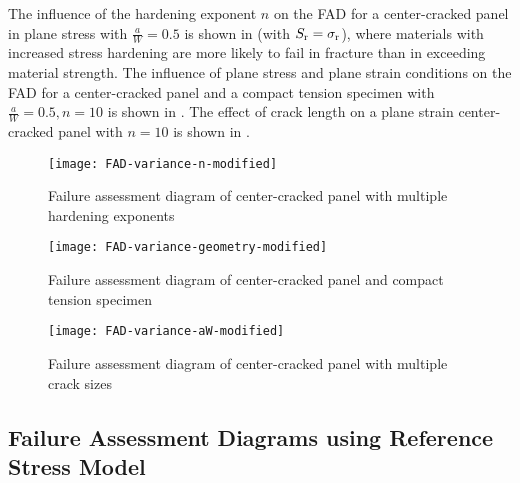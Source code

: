 The influence of the hardening exponent \(n\) on the FAD for a center-cracked panel in plane stress with \(\frac{a}{W} = 0.5\) is shown in  (with \(S_{\text{r}} = \sigma_{\textnormal{r}}\)), where materials with increased stress hardening are more likely to fail in fracture than in exceeding material strength.
The influence of plane stress and plane strain conditions on the FAD for a center-cracked panel and a compact tension specimen with \(\frac{a}{W} = 0.5, n = 10\) is shown in .
The effect of crack length on a plane strain center-cracked panel with \(n = 10\) is shown in .
\begin{figure}
\centering
\texttt{[image: FAD-variance-n-modified]}
\caption[Failure assessment diagram of center-cracked panel with multiple hardening exponents]{\label{fig:fad-ccp-multiple-n} Failure assessment diagram of center-cracked panel with multiple hardening exponents \cite{epri1981}}
\end{figure}
\begin{figure}
\centering
\texttt{[image: FAD-variance-geometry-modified]}
\caption[Failure assessment diagram of center-cracked panel and compact tension specimen]{\label{fig:fad-ccp-ct} Failure assessment diagram of center-cracked panel and compact tension specimen \cite{epri1981}}
\end{figure}
\begin{figure}
\centering
\texttt{[image: FAD-variance-aW-modified]}
\caption[Failure assessment diagram of center-cracked panel with multiple crack sizes]{\label{fig:fad-crack-lengths} Failure assessment diagram of center-cracked panel with multiple crack sizes \cite{epri1981}}
\end{figure}

\subsection{Failure Assessment Diagrams using Reference Stress Model}

